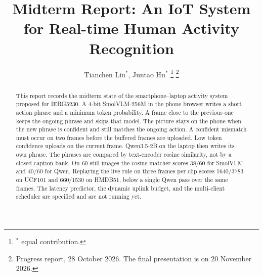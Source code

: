 \documentclass[lettersize,journal]{IEEEtran}
\begin{document}
\title{Midterm Report: An IoT System for Real-time Human Activity Recognition}

\author{Tianchen Liu$^{*}$, Juntao Hu$^{*}$
\thanks{$^*$ equal contribution.}
\thanks{Progress report, 28 October 2026. The final presentation is on 20 November 2026.}}

\maketitle

\begin{abstract}
This report records the midterm state of the smartphone--laptop activity
system proposed for IERG5230. A 4-bit SmolVLM-256M in the phone browser
writes a short action phrase and a minimum token probability. A frame
close to the previous one keeps the ongoing phrase and skips that model.
The picture stays on the phone when the new phrase is confident and still
matches the ongoing action. A confident mismatch must occur on two frames
before the buffered frames are uploaded. Low token confidence uploads on
the current frame. Qwen3.5-2B on the laptop then writes its own phrase.
The phrases are compared by text-encoder cosine similarity, not by a closed
caption bank. On 60 still images the cosine matcher scores 38/60 for
SmolVLM and 40/60 for Qwen. Replaying the live rule on three frames per
clip scores 1640/3783 on UCF101 and 660/1530 on HMDB51, below a single
Qwen pass over the same frames. The latency predictor, the dynamic uplink
budget, and the multi-client scheduler are specified and are not running
yet.
\end{abstract}











\end{document}
